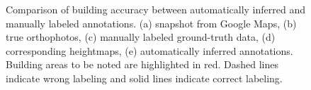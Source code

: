 \begin{figure}[H]
\begin{subfigure}{0.19\columnwidth}
 \caption{}
\end{subfigure}






\caption{Comparison of building accuracy between automatically inferred and manually labeled annotations. (a) snapshot from Google Maps, (b) true orthophotos, (c) manually labeled ground-truth data, (d) corresponding heightmaps, (e) automatically inferred annotations. Building areas to be noted are highlighted in red. Dashed lines indicate wrong labeling and solid lines indicate correct labeling.}
\label{fig:vai_comp_manual}
\end{figure}


